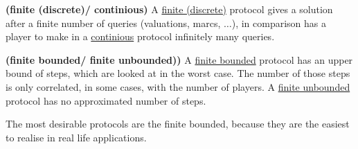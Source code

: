 \begin{defi}{\textbf{(finite (discrete)/ continious)}}
\newline A \underline{finite (discrete)} protocol gives a solution after a finite number of queries (valuations, marcs, $\ldots$), in comparison has a player to make in a \underline{continious} protocol infinitely many queries.
\end{defi}
\begin{defi}{\textbf{(finite bounded/ finite unbounded))}}
\newline A \underline{finite bounded} protocol has an upper bound of steps, which are looked at in the worst case. The number of those steps is only correlated, in some cases, with the number of players. A \underline{finite unbounded} protocol has no approximated number of steps.
\end{defi}
The most desirable protocols are the finite bounded, because they are the easiest to realise in real life applications. 
\pagebreak
